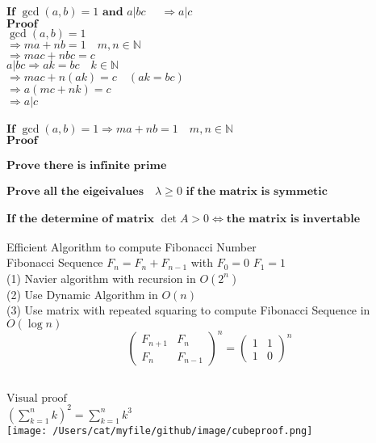 \documentclass[10pt]{article}
\begin{document}
$\textbf{If }  \gcd(a, b) = 1 \textbf{ and }  a \vert bc \quad$  $\Rightarrow a \vert c$ \\
$\textbf{Proof}$ \\
$\gcd(a, b) = 1  $\\
$\Rightarrow ma+nb = 1\quad m, n \in \mathbb{N} $ \\
$\Rightarrow mac + nbc = c$ \\
$a \vert bc \Rightarrow ak = bc \quad k \in \mathbb{N} $ \\
$\Rightarrow mac + n(ak)=c \quad    (ak=bc) $ \\
$\Rightarrow a(mc + nk) = c$  \\
$\Rightarrow a \vert c $ \\
\\
$\textbf{If } \gcd(a, b) = 1 \Rightarrow ma + nb = 1 \quad m, n \in \mathbb{N}$\\
$\textbf{Proof}$\\
\\
$\textbf{Prove there is infinite prime}$\\
\\
$\textbf{Prove all the eigeivalues}\quad  \lambda \geq  0  \textbf{ if the matrix is symmetic}$\\
\\
$\textbf{If the determine of matrix } \det{A} > 0 \iff \textbf{the matrix is invertable}$\\
\\
Efficient Algorithm to compute Fibonacci Number \\
Fibonacci Sequence   
$F_{n} = F_{n} + F_{n-1}$ with $F_{0} = 0$
$F_{1} = 1$ \\
(1) Navier algorithm with recursion in $O(2^n)$ \\
(2) Use Dynamic Algorithm in $O(n)$\\
(3) Use matrix with repeated squaring to compute Fibonacci Sequence in $O(\log{n})$
\[\left(\begin{array}{cc} F_{n+1} & F_{n} \\ F_{n} & F_{n-1} \end{array} \right)^n =  \left(\begin{array}{cc}1 & 1 \\ 1 & 0 \end{array} \right)^n \]
\\
\newpage

\begin{flushleft}
$\text{Visual proof}$\\
$ (\sum_{k=1}^{n} k)^{2} = \sum_{k=1}^{n} k^{3}$\\
\texttt{[image: /Users/cat/myfile/github/image/cubeproof.png]}
\end{flushleft}
\end{document}
